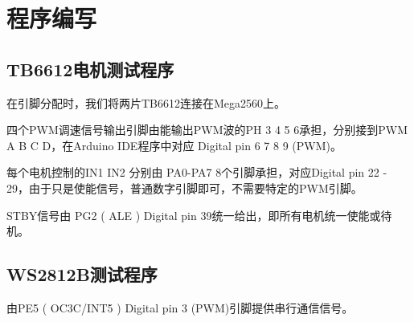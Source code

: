 \chapter{程序编写}
\label{cha:Program}

\section{TB6612电机测试程序}

在引脚分配时，我们将两片TB6612连接在Mega2560上。

四个PWM调速信号输出引脚由能输出PWM波的PH 3 4 5 6承担，分别接到PWM A B C D，在Arduino IDE程序中对应 Digital pin 6 7 8 9 (PWM)。

每个电机控制的IN1 IN2 分别由 PA0-PA7 8个引脚承担，对应Digital pin 22 - 29，由于只是使能信号，普通数字引脚即可，不需要特定的PWM引脚。

STBY信号由 PG2 ( ALE ) Digital pin 39统一给出，即所有电机统一使能或待机。

\section{WS2812B测试程序}

由PE5 ( OC3C/INT5 ) Digital pin 3 (PWM)引脚提供串行通信信号。